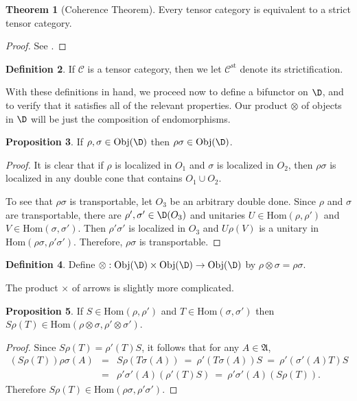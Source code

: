 \documentclass[12pt]{article}
\newcommand{\alg}[1]{\mathfrak{#1}}
\theoremstyle{definition}
\newtheorem{thm}{Theorem}[section]
\newtheorem{prop}[thm]{Proposition}
\theoremstyle{definition}
\newtheorem{defn}[thm]{Definition}
\theoremstyle{remark}
\newcommand{\Obj}{\mathrm{Obj}}
\def\2#1{{\mathcal #1}}
\newcommand{\Hom}{\mathrm{Hom}}
\begin{document}
\begin{thm}[Coherence Theorem] Every tensor category is
  equivalent to a strict tensor
  category. \label{coherence}
\end{thm}

\begin{proof} See \cite{cwm}. \end{proof}

\begin{defn} If $\2C$ is a tensor category, then we let
  $\2C ^{\mathrm{st}}$ denote its
  strictification. \end{defn}

With these definitions in hand, we proceed now to define a bifunctor on $\D$, and to
verify that it satisfies all of the relevant properties.  Our product $\otimes$ of
objects in $\D$ will be just the composition of endomorphisms.

\begin{prop} If $\rho ,\sigma \in \Obj (\D )$ then $\rho \sigma \in \Obj (\D )$.
\end{prop}

\begin{proof} It is clear that if $\rho$ is localized in $O_1$ and $\sigma$ is
  localized in $O_2$, then $\rho \sigma$ is localized in any double cone that
  contains $O_1\cup O_2$.  

  To see that $\rho \sigma$ is transportable, let $O_3$
  be an arbitrary double done.  Since $\rho$ and
  $\sigma$ are transportable, there are $\rho ',\sigma
  '\in \D (O_3)$ and unitaries $U\in \Hom (\rho ,\rho
  ')$ and $V\in \Hom (\sigma ,\sigma ')$.  Then $\rho
  '\sigma '$ is localized in $O_3$ and $U\rho (V)$ is a
  unitary in $\Hom (\rho \sigma ,\rho '\sigma ')$.
  Therefore, $\rho \sigma$ is transportable.
\end{proof}

\begin{defn} Define $\otimes :\Obj (\D )\times \Obj (\D )\to \Obj (\D )$ by $\rho
  \otimes \sigma =\rho \sigma$.  \end{defn}  

The product $\times$ of arrows is slightly more complicated.

\begin{prop} If $S\in \Hom (\rho ,\rho ')$ and $T\in \Hom (\sigma ,\sigma ')$ then
  $S\rho (T)\in \Hom (\rho \otimes \sigma ,\rho '\otimes \sigma ')$. \end{prop}

\begin{proof} Since $S\rho (T)=\rho '(T)S$, it follows that for any $A\in \alg{A}$,
  \begin{eqnarray*} (S\rho (T))\rho \sigma (A) &=& S\rho (T\sigma (A)) \:= \: \rho
    '(T\sigma (A))S \:=\: \rho '(\sigma '(A)T)S \\
    &=& \rho '\sigma '(A)(\rho '(T)S) \: =\: \rho '\sigma '(A)(S\rho (T)).
  \end{eqnarray*} Therefore $S\rho (T)\in \Hom (\rho \sigma ,\rho' \sigma ')$.
\end{proof}
\end{document}
